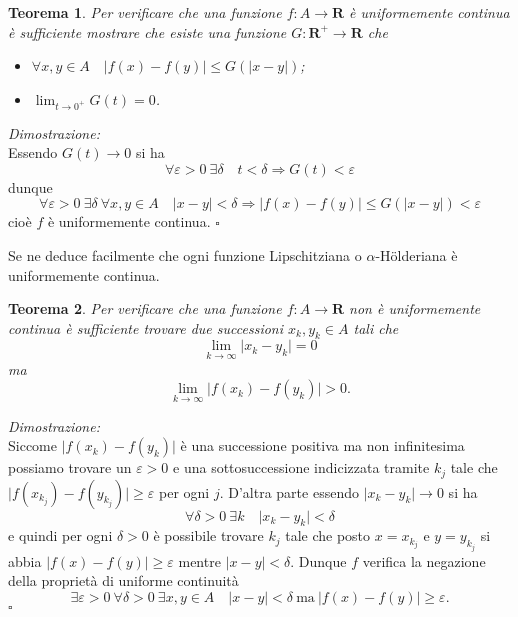 \documentclass[italian,a4paper]{article}
\newcommand{\R}{\mathbf{R}}
\renewcommand{\epsilon}{\varepsilon}
\newtheorem{theorem}{Teorema}
\newenvironment{proof}
        {%
                {}%
                {%
                }%
        \noindent%
        {\it Dimostrazione:}\\%
        }%
        {%
        \hfill$\square$%
        }
\begin{document}
\begin{theorem}
Per verificare che una funzione $f\colon A\to \R$ \`e uniformemente
continua \`e sufficiente mostrare che esiste una funzione $G\colon \R^+ \to \R$
che
\begin{itemize}
\item $\forall x,y\in A \quad \vert f(x)-f(y)\vert \le G(\vert x-y\vert)$;
\item $\lim_{t\to 0^+} G(t)=0$.
\end{itemize}
\end{theorem}
\begin{proof}
Essendo $G(t)\to 0$ si ha 
\[
	\forall \epsilon>0\  \exists \delta\quad 
	t<\delta \Rightarrow G(t)<\epsilon
\]
dunque
\[
	\forall \epsilon>0\ \exists \delta\ \forall x,y\in A\quad
	\vert x-y \vert <\delta \Rightarrow \vert f(x)-f(y)\vert \le
	G(\vert x-y\vert)< \epsilon
\]
cio\`e $f$ \`e uniformemente continua.
\end{proof}

Se ne deduce facilmente che ogni funzione Lipschitziana o
$\alpha$-H\"o{}lderiana \`e uniformemente continua.

\begin{theorem}
Per verificare che una funzione $f\colon A\to \R$ non \`e
uniformemente continua \`e sufficiente trovare due successioni
$x_k,y_k\in A$ tali che
\[
	\lim_{k\to\infty} \vert x_k - y_k\vert =0
\]
ma
\[
	\lim_{k\to \infty} \vert f(x_k)-f(y_k)\vert > 0.
\]
\end{theorem}
\begin{proof}
Siccome $\vert f(x_k)-f(y_k)\vert$ \`e una successione positiva ma non
infinitesima possiamo trovare un $\epsilon>0$ e una sottosuccessione
indicizzata tramite $k_j$ tale che $\vert
f(x_{k_j})-f(y_{k_j})\vert \ge \epsilon$ per ogni $j$.
D'altra parte essendo $\vert x_k - y_k\vert \to 0$ si
ha
\[
	\forall \delta>0\ \exists k \quad \vert x_k- y_k\vert < \delta
\]
e quindi per ogni $\delta>0$ \`e possibile trovare $k_j$ tale che
posto $x=x_{k_j}$ e $y=y_{k_j}$ si abbia $\vert f(x)-f(y)\vert \ge
\epsilon$ mentre $\vert x - y\vert <\delta$.
Dunque $f$ verifica la negazione della propriet\`a di uniforme continuit\`a
\[
\exists \epsilon>0\ \forall \delta>0\ \exists x,y\in A
\quad \vert x-y\vert < \delta\ \mathrm{ma}\ \vert f(x)-f(y)\vert \ge \epsilon.
\]
\end{proof}
\end{document}
